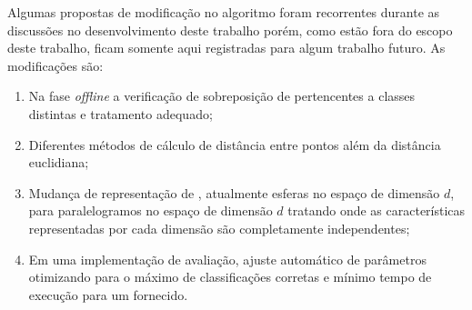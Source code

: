 Algumas propostas de modificação no algoritmo \minas foram recorrentes durante
as discussões no desenvolvimento deste trabalho porém, como estão fora do escopo
deste trabalho, ficam somente aqui registradas para algum trabalho futuro.
As modificações são:

\begin{enumerate}[label={\alph*)}]

  \item Na fase \emph{offline} a verificação de sobreposição de \clusters
  pertencentes a classes distintas e tratamento adequado;
  
  \item Diferentes métodos de cálculo de distância entre pontos além da
  distância euclidiana;
  
  \item Mudança de representação de \clusters, atualmente esferas no espaço de
  dimensão $d$, para paralelogramos no espaço de dimensão $d$ tratando \datasets
  onde as características representadas por cada dimensão são completamente
  independentes;
  
  

  \item Em uma implementação de avaliação, ajuste automático de parâmetros
  otimizando para o máximo de classificações corretas e mínimo tempo de execução
  para um \dataset fornecido.

\end{enumerate}


